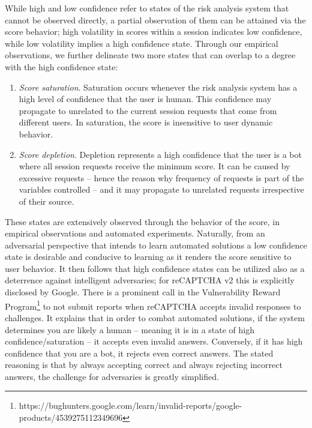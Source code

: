 While high and low confidence refer to states of the risk analysis system that cannot be observed directly, a partial observation of them can be attained via the score behavior; high volatility in scores within a session indicates low confidence, while low volatility implies a high confidence state.
Through our empirical observations, we further delineate two more states that can overlap to a degree with the high confidence state:
\begin{enumerate}
\item \emph{Score saturation}. Saturation occurs whenever the risk analysis system has a high level of confidence that the user is human.
This confidence may propagate to unrelated to the current session requests that come from different users.
In saturation, the score is insensitive to user dynamic behavior.
\item \emph{Score depletion}.
Depletion represents a high confidence that the user is a bot where all session requests receive the minimum score.
It can be caused by excessive requests -- hence the reason why frequency of requests is part of the variables controlled -- and it may propagate to unrelated requests irrespective of their source.
\end{enumerate}

These states are extensively observed through the behavior of the score, in empirical observations and automated experiments.
Naturally, from an adversarial perspective that intends to learn automated solutions a low confidence state is desirable and conducive to learning as it renders the score sensitive to user behavior.
It then follows that high confidence states can be utilized also as a deterrence against intelligent adversaries; for reCAPTCHA v2 this is explicitly disclosed by Google.
There is a prominent call in the Vulnerability Reward Program\footnote{https://bughunters.google.com/learn/invalid-reports/google-products/4539275112349696} to not submit reports when reCAPTCHA accepts invalid responses to challenges.
It explains that in order to combat automated solutions, if the system determines you are likely a human -- meaning it is in a state of high confidence/saturation -- it accepts even invalid answers.
Conversely, if it has high confidence that you are a bot, it rejects even correct answers.
The stated reasoning is that by always accepting correct and always rejecting incorrect answers, the challenge for adversaries is greatly simplified.

